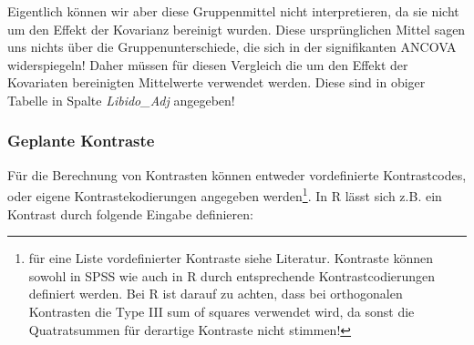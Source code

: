 \documentclass[]{article}
\newenvironment{Shaded}{\begin{snugshade}}{\end{snugshade}}
\newcommand{\CommentTok}[1]{\textcolor[rgb]{0.56,0.35,0.01}{\textit{#1}}}
\newcommand{\DecValTok}[1]{\textcolor[rgb]{0.00,0.00,0.81}{#1}}
\newcommand{\KeywordTok}[1]{\textcolor[rgb]{0.13,0.29,0.53}{\textbf{#1}}}
\newcommand{\NormalTok}[1]{#1}
\newcommand{\OperatorTok}[1]{\textcolor[rgb]{0.81,0.36,0.00}{\textbf{#1}}}
\newcommand{\StringTok}[1]{\textcolor[rgb]{0.31,0.60,0.02}{#1}}
\let\rmarkdownfootnote\footnote%
\def\footnote{\protect\rmarkdownfootnote}
\begin{document}
Eigentlich können wir aber diese Gruppenmittel nicht interpretieren, da sie nicht um den Effekt der Kovarianz bereinigt wurden. Diese ursprünglichen Mittel sagen uns nichts über die Gruppenunterschiede, die sich in der signifikanten ANCOVA widerspiegeln! Daher müssen für diesen Vergleich die um den Effekt der Kovariaten bereinigten Mittelwerte verwendet werden. Diese sind in obiger Tabelle in Spalte \emph{Libido\_Adj} angegeben!

\hypertarget{geplante-kontraste}{%
\subsubsection*{Geplante Kontraste}\label{geplante-kontraste}}

Für die Berechnung von Kontrasten können entweder vordefinierte Kontrastcodes, oder eigene Kontrastekodierungen angegeben werden\footnote{für eine Liste vordefinierter Kontraste siehe Literatur. Kontraste können sowohl in SPSS wie auch in R durch entsprechende Kontrastcodierungen definiert werden. Bei R ist darauf zu achten, dass bei orthogonalen Kontrasten die Type III sum of squares verwendet wird, da sonst die Quatratsummen für derartige Kontraste nicht stimmen!}. In R lässt sich z.B. ein Kontrast durch folgende Eingabe definieren:

\begin{Shaded}
\end{Shaded}
\end{document}
